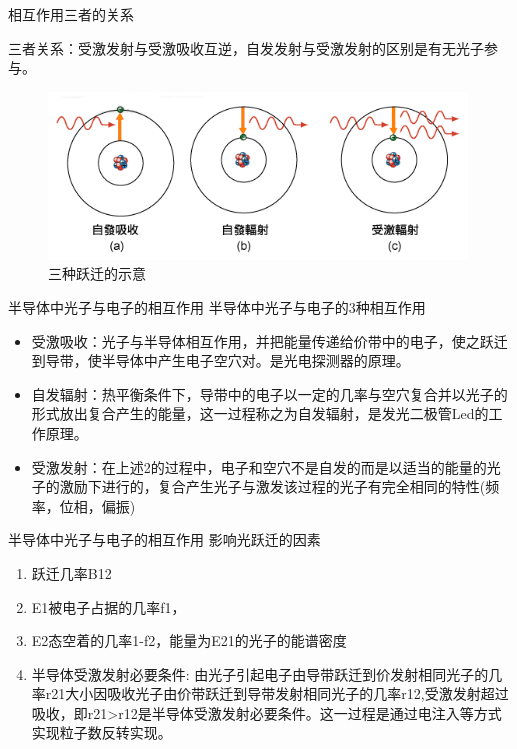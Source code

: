 \documentclass[trans]{beamer} %
\begin{document}
\begin{frame}{相互作用三者的关系}

三者关系：受激发射与受激吸收互逆，自发发射与受激发射的区别是有无光子参与。

    \begin{figure}[htbp] 
    \centering\includegraphics[height=1.75in]{source/ch2/fg222.png} 
    \caption{三种跃迁的示意}
    \end{figure}  

 \end{frame}
\begin{frame}{半导体中光子与电子的相互作用}
半导体中光子与电子的3种相互作用
    \begin{itemize}
        \item \alert{受激吸收}：光子与半导体相互作用，并把能量传递给价带中的电子，使之跃迁到导带，使半导体中产生电子空穴对。是光电探测器的原理。
        \item  \alert{自发辐射}：热平衡条件下，导带中的电子以一定的几率与空穴复合并以光子的形式放出复合产生的能量，这一过程称之为自发辐射，是发光二极管Led的工作原理。
        \item \alert{ 受激发射}：在上述2的过程中，电子和空穴不是自发的而是以适当的能量的光子的激励下进行的，复合产生光子与激发该过程的光子有完全相同的特性(频率，位相，偏振)

    \end{itemize}
 \end{frame}
\begin{frame}{半导体中光子与电子的相互作用}
影响光跃迁的因素
    \begin{enumerate}
        \item 跃迁几率B12
        \item  E1被电子占据的几率f1，
        \item E2态空着的几率1-f2，能量为E21的光子的能谱密度
        \item \alert{半导体受激发射必要条件:}
由光子引起电子由导带跃迁到价发射相同光子的几率r21大小因吸收光子由价带跃迁到导带发射相同光子的几率r12,受激发射超过吸收，即r21>r12是半导体受激发射必要条件。这一过程是通过电注入等方式实现粒子数反转实现。

    \end{enumerate}
 \end{frame}
 
\end{document}
